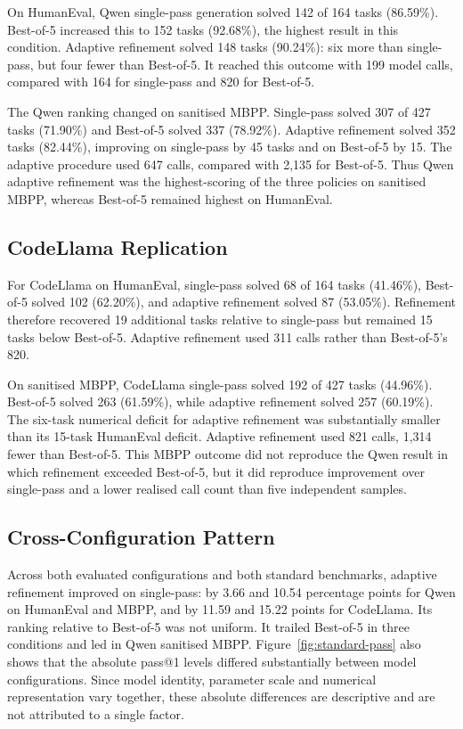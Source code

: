 On HumanEval, Qwen single-pass generation solved 142 of 164 tasks (86.59\%). Best-of-5 increased this to 152 tasks (92.68\%), the highest result in this condition. Adaptive refinement solved 148 tasks (90.24\%): six more than single-pass, but four fewer than Best-of-5. It reached this outcome with 199 model calls, compared with 164 for single-pass and 820 for Best-of-5.

The Qwen ranking changed on sanitised MBPP. Single-pass solved 307 of 427 tasks (71.90\%) and Best-of-5 solved 337 (78.92\%). Adaptive refinement solved 352 tasks (82.44\%), improving on single-pass by 45 tasks and on Best-of-5 by 15. The adaptive procedure used 647 calls, compared with 2,135 for Best-of-5. Thus Qwen adaptive refinement was the highest-scoring of the three policies on sanitised MBPP, whereas Best-of-5 remained highest on HumanEval.

\subsection{CodeLlama Replication}

For CodeLlama on HumanEval, single-pass solved 68 of 164 tasks (41.46\%), Best-of-5 solved 102 (62.20\%), and adaptive refinement solved 87 (53.05\%). Refinement therefore recovered 19 additional tasks relative to single-pass but remained 15 tasks below Best-of-5. Adaptive refinement used 311 calls rather than Best-of-5's 820.

On sanitised MBPP, CodeLlama single-pass solved 192 of 427 tasks (44.96\%). Best-of-5 solved 263 (61.59\%), while adaptive refinement solved 257 (60.19\%). The six-task numerical deficit for adaptive refinement was substantially smaller than its 15-task HumanEval deficit. Adaptive refinement used 821 calls, 1,314 fewer than Best-of-5. This MBPP outcome did not reproduce the Qwen result in which refinement exceeded Best-of-5, but it did reproduce improvement over single-pass and a lower realised call count than five independent samples.

\subsection{Cross-Configuration Pattern}

Across both evaluated configurations and both standard benchmarks, adaptive refinement improved on single-pass: by 3.66 and 10.54 percentage points for Qwen on HumanEval and MBPP, and by 11.59 and 15.22 points for CodeLlama. Its ranking relative to Best-of-5 was not uniform. It trailed Best-of-5 in three conditions and led in Qwen sanitised MBPP. Figure~\ref{fig:standard-pass} also shows that the absolute pass@1 levels differed substantially between model configurations. Since model identity, parameter scale and numerical representation vary together, these absolute differences are descriptive and are not attributed to a single factor.

